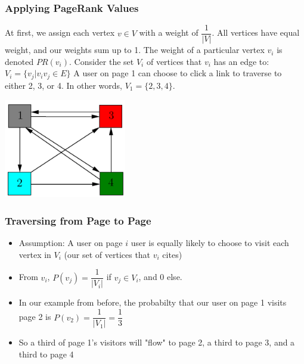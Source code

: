 \documentclass{beamer}
\begin{document}
\begin{frame}[t]
\frametitle{Applying PageRank Values}
\begin{outline}
    \1 At first, we assign each vertex $v\in V$ with a weight of $\dfrac{1}{|V|}$. 
    \1 All vertices have equal weight, and our weights sum up to 1. The weight of a particular vertex $v_i$ is denoted $PR(v_i)$.
    \1 Consider the set $V_i$ of vertices that $v_i$ has an edge to:
        \2 $V_i = \{v_j | v_iv_j \in E\}$
    \1 A user on page 1 can choose to click a link to traverse to either 2, 3, or 4. In other words, $V_1 = \{2, 3, 4\}$.
\end{outline}
\begin{center}
    \includegraphics[width=0.4\textwidth]{unweighted.png}
\end{center}
\end{frame}

\begin{frame}[t]
\frametitle{Traversing from Page to Page}
\begin{itemize}
    \setlength\itemsep{1em}
    \item Assumption: A user on page $i$ user is equally likely to choose to visit each vertex in $V_i$ (our set of vertices that $v_i$ cites)
    \item From $v_i$, $P(v_j) = \dfrac{1}{|V_i|}$ if $v_j \in V_i$, and 0 else.
    \item In our example from before, the probabilty that our user on page 1 visits page 2 is $P(v_2) = \dfrac{1}{|V_1|} = \dfrac{1}{3}$
    \item So a third of page 1's visitors will "flow" to page 2, a third to page 3, and a third to page 4
\end{itemize}
\end{frame}
\end{document}

